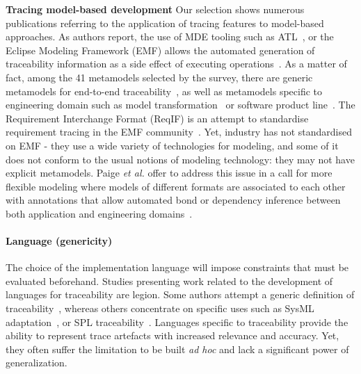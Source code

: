 \textbf{Tracing model-based development}
Our selection shows numerous publications referring to the application of tracing features to model-based approaches. As authors report, the use of MDE tooling such as ATL~\cite{Santiago_2013,Jim_nez_2013}, or the Eclipse Modeling Framework (EMF) allows the automated generation of traceability information as a side effect of executing operations~\cite{galvao2007-survey-traceability-in-MDE,winkler2010-survey-traceability-and-MDE}. 
As a matter of fact, among the 41 metamodels selected by the survey, there are generic metamodels for end-to-end traceability~\cite{heisig2019-generic-traceability-metamodel-end-to-end-capra,Haidrar_2016}, as well as metamodels specific to engineering domain such as model transformation~\cite{Jim_nez_2013,anquetil2010-model-driven-tracea-for-SPL,vara2014-traceability-in-MDD-MTransfo} or software product line~\cite{Jim_nez_2013,vara2014-traceability-in-MDD-MTransfo}. 
The Requirement Interchange Format (ReqIF) is an attempt to standardise requirement tracing in the EMF community~\cite{Graf_2012}.
Yet, industry has not standardised on EMF - they use a wide variety of technologies for modeling, and some of it does not conform to the usual notions of modeling technology: they may not have explicit metamodels.
Paige \textit{et al.} offer to address this issue in a call for more flexible modeling where models of different formats are associated to each other with annotations that allow automated bond or dependency inference between both application and engineering domains~\cite{seiler2019-comparing-trac-through-IR-Commits-Logs,paige2017-changing-mde}.



\paragraph{Language (genericity)} 
The choice of the implementation language will impose constraints that must be evaluated beforehand. Studies presenting work related to the development of languages for traceability are legion. Some authors attempt a generic definition of traceability~\cite{heisig2019-generic-traceability-metamodel-end-to-end-capra,azevedo2019-traceability-metamodel-and-reference-model}, whereas others concentrate on specific uses such as SysML adaptation~\cite{nejat2012-traceability-sysml-safety-certification}, or SPL traceability~\cite{anquetil2010-model-driven-tracea-for-SPL}. 
Languages specific to traceability provide the ability to represent trace artefacts with increased relevance and accuracy. Yet, they often suffer the limitation to be built \textit{ad hoc} and lack a significant power of generalization.

